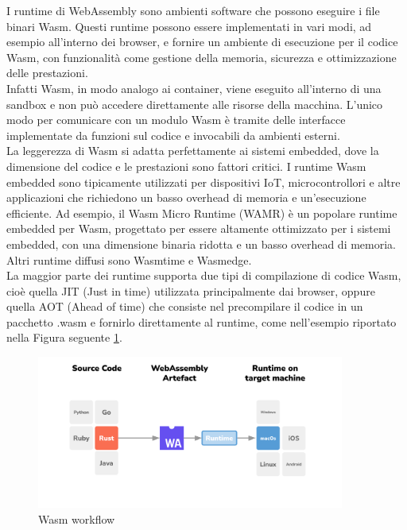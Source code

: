 I runtime di WebAssembly sono ambienti software che possono eseguire i file binari Wasm. Questi runtime possono essere implementati in vari modi, ad esempio all'interno dei browser, e fornire un ambiente di esecuzione per il codice Wasm, con funzionalità come gestione della memoria, sicurezza e ottimizzazione delle prestazioni.\\
Infatti Wasm, in modo analogo ai container, viene eseguito all'interno di una sandbox e non può accedere direttamente alle risorse della macchina. L'unico modo per comunicare con un modulo Wasm è tramite delle interfacce implementate da funzioni sul codice e invocabili da ambienti esterni.\\
La leggerezza di Wasm si adatta perfettamente ai sistemi embedded, dove la dimensione del codice e le prestazioni sono fattori critici. I runtime Wasm embedded sono tipicamente utilizzati per dispositivi IoT, microcontrollori e altre applicazioni che richiedono un basso overhead di memoria e un'esecuzione efficiente. Ad esempio, il Wasm Micro Runtime (WAMR)\cite{bytecodealliance_wasm_micro_runtime} è un popolare runtime embedded per Wasm, progettato per essere altamente ottimizzato per i sistemi embedded, con una dimensione binaria ridotta e un basso overhead di memoria. Altri runtime diffusi sono Wasmtime\cite{wasmtime_introduction} e Wasmedge\cite{wasmedge_wasmedge}.\\
La maggior parte dei runtime supporta due tipi di compilazione di codice Wasm, cioè quella JIT (Just in time) utilizzata principalmente dai browser, oppure quella AOT (Ahead of time) che consiste nel precompilare il codice in un pacchetto .wasm e fornirlo direttamente al runtime, come nell'esempio riportato nella Figura seguente \ref{fig:wasm_workflow}.

\FloatBarrier
\begin{figure}[h]
    \centering
    \includegraphics[width=0.9\textwidth]{img/wasm-runtime.png}
    \caption{Wasm workflow\protect\footnotemark}
    \label{fig:wasm_workflow}
\end{figure}
\FloatBarrier
{}

